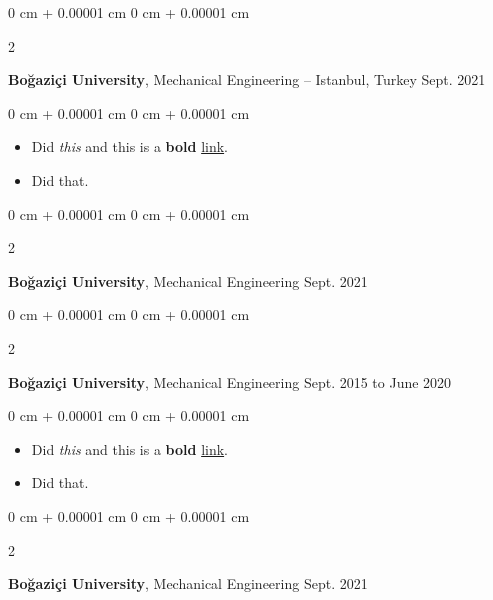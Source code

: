 \documentclass[10pt, letterpaper]{article}
\newenvironment{highlights}{
    \begin{itemize}[
        topsep=0.10 cm,
        parsep=0.10 cm,
        partopsep=0pt,
        itemsep=0pt,
        leftmargin=0 cm + 10pt
    ]
}{
    \end{itemize}
        
    \vspace{-0.10cm}
} %
\newenvironment{onecolentry}{
    \begin{adjustwidth}{
        0 cm + 0.00001 cm
    }{
        0 cm + 0.00001 cm
    }
}{
    \end{adjustwidth}
} %
\newenvironment{twocolentry}[2][]{
    \onecolentry
    \def\secondColumn{#2}
    \setcolumnwidth{\fill, 4.1 cm}
    \begin{paracol}{2}
}{
    \switchcolumn \raggedleft \secondColumn
    \end{paracol}
    \endonecolentry
} %
\begin{document}
        \vspace{0.15 cm}

        \begin{twocolentry}{
            Sept. 2021
        }
            \textbf{Boğaziçi University}, Mechanical Engineering -- Istanbul, Turkey\end{twocolentry}

        \vspace{0.10 cm}
        \begin{onecolentry}
            \begin{highlights}
                \item Did \textit{this} and this is a \textbf{bold} \href{https://example.com}{link}.
                \item Did that.
            \end{highlights}
        \end{onecolentry}


        \vspace{0.15 cm}

        \begin{twocolentry}{
            Sept. 2021
        }
            \textbf{Boğaziçi University}, Mechanical Engineering\end{twocolentry}

        \vspace{0.10 cm}


        \vspace{0.15 cm}

        \begin{twocolentry}{
            Sept. 2015 to June 2020
        }
            \textbf{Boğaziçi University}, Mechanical Engineering\end{twocolentry}

        \vspace{0.10 cm}
        \begin{onecolentry}
            \begin{highlights}
                \item Did \textit{this} and this is a \textbf{bold} \href{https://example.com}{link}.
                \item Did that.
            \end{highlights}
        \end{onecolentry}


        \vspace{0.15 cm}

        \begin{twocolentry}{
            Sept. 2021
        }
            \textbf{Boğaziçi University}, Mechanical Engineering\end{twocolentry}
\end{document}
